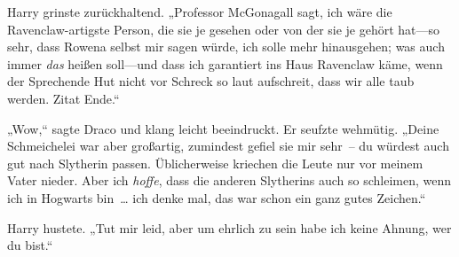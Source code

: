 Harry grinste zurückhaltend. „Professor McGonagall sagt, ich wäre die Ravenclaw-artigste Person, die sie je gesehen oder von der sie je gehört hat—so sehr, dass Rowena selbst mir sagen würde, ich solle mehr hinausgehen; was auch immer \emph{das} heißen soll—und dass ich garantiert ins Haus Ravenclaw käme, wenn der Sprechende Hut nicht vor Schreck so laut aufschreit, dass wir alle taub werden. Zitat Ende.“

„Wow,“ sagte Draco und klang leicht beeindruckt. Er seufzte wehmütig. „Deine Schmeichelei war aber großartig, zumindest gefiel sie mir sehr – du würdest auch gut nach Slytherin passen. Üblicherweise kriechen die Leute nur vor meinem Vater nieder. Aber ich \emph{hoffe}, dass die anderen Slytherins auch so schleimen, wenn ich in Hogwarts bin … ich denke mal, das war schon ein ganz gutes Zeichen.“

Harry hustete. „Tut mir leid, aber um ehrlich zu sein habe ich keine Ahnung, wer du bist.“

